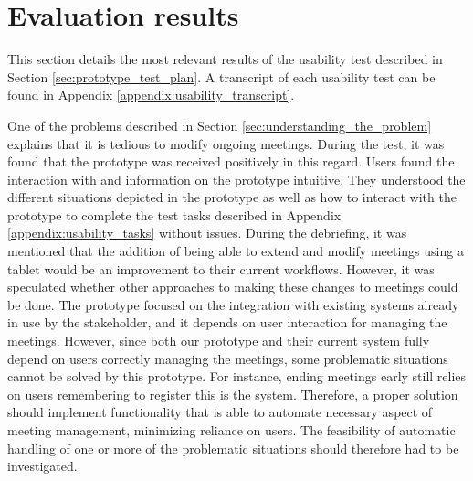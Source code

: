 \section{Evaluation results}\label{sec:usability_evaluation_results}
This section details the most relevant results of the usability test described in Section \ref{sec:prototype_test_plan}.
A transcript of each usability test can be found in Appendix \ref{appendix:usability_transcript}.

One of the problems described in Section \ref{sec:understanding_the_problem} explains that it is tedious to modify ongoing meetings. 
During the test, it was found that the prototype was received positively in this regard. 
Users found the interaction with and information on the prototype intuitive. 
They understood the different situations depicted in the prototype as well as how to interact with the prototype to complete the test tasks described in Appendix \ref{appendix:usability_tasks} without issues.
During the debriefing, it was mentioned that the addition of being able to extend and modify meetings using a tablet would be an improvement to their current workflows.
However, it was speculated whether other approaches to making these changes to meetings could be done. 
The prototype focused on the integration with existing systems already in use by the stakeholder, and it depends on user interaction for managing the meetings.
However, since both our prototype and their current system fully depend on users correctly managing the meetings, some problematic situations cannot be solved by this prototype. 
For instance, ending meetings early still relies on users remembering to register this is the system. 
Therefore, a proper solution should implement functionality that is able to automate necessary aspect of meeting management, minimizing reliance on users.
The feasibility of  automatic handling of one or more of the problematic situations should therefore had to be investigated.